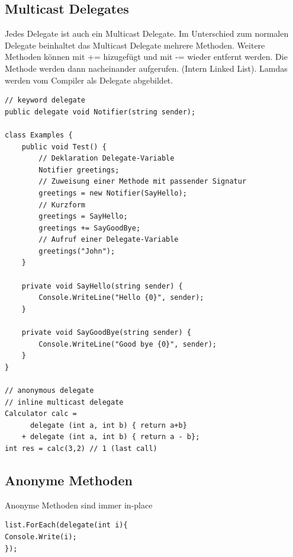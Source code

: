 \clearpage

\subsection{Multicast Delegates} \label{sec:multicastDelegates}
Jedes Delegate ist auch ein Multicast Delegate. Im Unterschied zum normalen Delegate beinhaltet das Multicast Delegate mehrere Methoden. Weitere Methoden können mit += hizugefügt und mit -= wieder entfernt werden. Die Methode werden dann nacheinander aufgerufen. (Intern Linked List). Lamdas werden vom Compiler als Delegate abgebildet.
\begin{lstlisting}
// keyword delegate
public delegate void Notifier(string sender);

class Examples {
	public void Test() {
		// Deklaration Delegate-Variable
		Notifier greetings; 
		// Zuweisung einer Methode mit passender Signatur
		greetings = new Notifier(SayHello); 
		// Kurzform
		greetings = SayHello;
		greetings += SayGoodBye;
		// Aufruf einer Delegate-Variable
		greetings("John");
	}

	private void SayHello(string sender) {
		Console.WriteLine("Hello {0}", sender);
	}
	
	private void SayGoodBye(string sender) {
		Console.WriteLine("Good bye {0}", sender);
	}
} 

// anonymous delegate
// inline multicast delegate
Calculator calc =  
	  delegate (int a, int b) { return a+b}
	+ delegate (int a, int b) { return a - b};
int res = calc(3,2) // 1 (last call)
\end{lstlisting}

\subsection{Anonyme Methoden}
Anonyme Methoden sind immer in-place
\begin{lstlisting}
list.ForEach(delegate(int i){
Console.Write(i);
});
\end{lstlisting}

\clearpage

